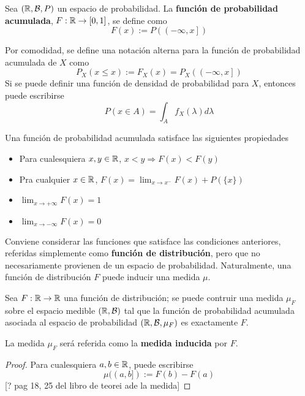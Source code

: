 \begin{definicion}%
Sea $(\mathbb{R},\mathcal{B},P)$ un espacio de probabilidad. La \textbf{función de probabilidad acumulada}, $F : \mathbb{R} \rightarrow [0,1]$, se define como
\begin{equation*}
F (x) := P\left( \left(-\infty,x \right] \right)
\end{equation*}
\end{definicion}

Por comodidad, se define una notación alterna para la función de probabilidad acumulada de $X$ como
\begin{equation}
P_X(x\leq x) := F_X(x) = P_X\left( \left( -\infty,x \right] \right)
\end{equation}
Si se puede definir una función de densidad de probabilidad para $X$, entonces puede escribirse
\begin{equation}
P(x\in A) = \int_A f_X(\lambda) d\lambda 
\end{equation}

Una función de probabilidad acumulada satisface las siguientes propiedades
\begin{itemize}
\item Para cualesquiera $x,y\in \mathbb{R}$, $x < y \Rightarrow F(x) < F(y)$
\item Pra cualquier $x\in\mathbb{R}$, $F(x) = \lim_{x\rightarrow x^{-}} F(x) + P(\{x\})$
\item $\lim_{x\rightarrow +\infty} F(x) = 1$
\item $\lim_{x\rightarrow -\infty} F(x) = 0$
\end{itemize}

Conviene considerar las funciones que satisface las condiciones anteriores, referidas simplemente como \textbf{función de distribución}, pero que no necesariamente provienen de un espacio de probabilidad. Naturalmente, una función de distribución $F$ puede inducir una medida $\mu$.

\begin{teorema}
Sea $F:\mathbb{R} \rightarrow \mathbb{R}$ una función de distribución; se puede contruir una medida $\mu_F$ sobre el espacio medible $(\mathbb{R}, \mathcal{B})$ tal que la función de probabilidad acumulada asociada al espacio de probabilidad $(\mathbb{R}, \mathcal{B}, \mu_F)$ es exactamente $F$.

La medida $\mu_F$ será referida como la \textbf{medida inducida} por $F$.
\end{teorema}
\begin{proof}
Para cualesquiera $a, b \in \mathbb{R}$, puede escribirse
\begin{equation}
\mu((a,b]) := F(b) - F(a)
\end{equation}
[? pag 18, 25 del libro de teorei ade la medida]
\end{proof}

